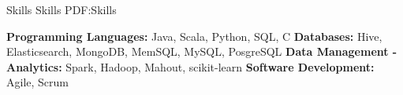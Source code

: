 
\Section
{Skills}
{Skills}
{PDF:Skills}

\Entry
\BulletItem
\textbf{Programming Languages: }Java, Scala, Python, SQL, C
\BulletItem
\textbf{Databases:} Hive, Elasticsearch, MongoDB, MemSQL, MySQL, PosgreSQL
\BulletItem
\textbf{Data Management - Analytics:} Spark, Hadoop, Mahout, scikit-learn
\BulletItem
\textbf{Software Development:} Agile, Scrum
